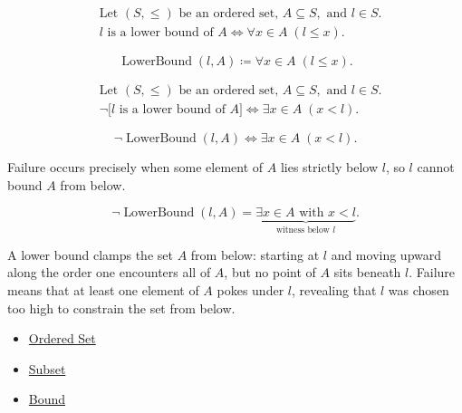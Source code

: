 \begin{remark*}
\[
\begin{aligned}
&\text{Let }(S,\le)\text{ be an ordered set, }A\subseteq S,\text{ and }l\in S.\\
&l\text{ is a lower bound of }A
\Longleftrightarrow
\forall x\in A\;(l\le x).
\end{aligned}
\]
\end{remark*}

\begin{remark*}
\[
\operatorname{LowerBound}(l,A) \coloneqq \forall x\in A\;(l\le x).
\]
\end{remark*}

\begin{remark*}
\[
\begin{aligned}
&\text{Let }(S,\le)\text{ be an ordered set, }A\subseteq S,\text{ and }l\in S.\\
&\neg\bigl[l\text{ is a lower bound of }A\bigr]
\Longleftrightarrow
\exists x\in A\;(x<l).
\end{aligned}
\]
\end{remark*}

\begin{remark*}
\[
\neg\operatorname{LowerBound}(l,A) \Longleftrightarrow \exists x\in A\;(x<l).
\]
\end{remark*}

\begin{remark*}
Failure occurs precisely when some element of $A$ lies strictly below $l$, so $l$ cannot bound $A$ from below.
\end{remark*}

\begin{remark*}
\[
\neg\operatorname{LowerBound}(l,A)
=
\underbrace{\exists x\in A\text{ with }x<l}_{\text{witness below }l}.
\]
\end{remark*}

\begin{remark*}[Interpretation]
A lower bound clamps the set $A$ from below: starting at $l$ and moving upward along the order one encounters all of $A$, but no point of $A$ sits beneath $l$. Failure means that at least one element of $A$ pokes under $l$, revealing that $l$ was chosen too high to constrain the set from below.
\end{remark*}

\begin{dependencies}
\begin{itemize}
  \item \hyperref[def:ordered-set]{Ordered Set}
  \item \hyperref[def:subset]{Subset}
  \item \hyperref[def:bound]{Bound}
\end{itemize}
\end{dependencies}


